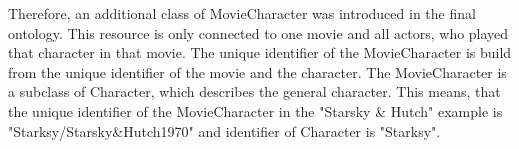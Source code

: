 Therefore, an additional class of MovieCharacter was introduced in the final ontology.
This resource is only connected to one movie and all actors, who played that character in that movie.
The unique identifier of the MovieCharacter is build from the unique identifier of the movie and the character.
The MovieCharacter is a subclass of Character, which describes the general character.
This means, that the unique identifier of the MovieCharacter in the "Starsky \& Hutch" example is "Starksy/Starsky\&Hutch1970" and identifier of Character is "Starksy".